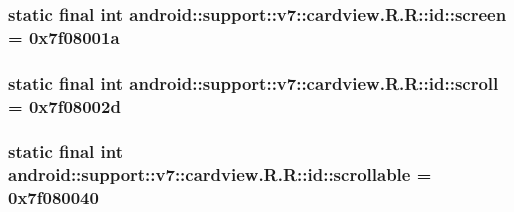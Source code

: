 \hypertarget{classandroid_1_1support_1_1v7_1_1cardview_1_1_r_1_1id_4f2f7f2b1b4bc84c004653ac2153b336}{
\subsubsection[{screen}]{\setlength{\rightskip}{0pt plus 5cm}static final int android::support::v7::cardview.R.R::id::screen = 0x7f08001a}}
\label{classandroid_1_1support_1_1v7_1_1cardview_1_1_r_1_1id_4f2f7f2b1b4bc84c004653ac2153b336}


\hypertarget{classandroid_1_1support_1_1v7_1_1cardview_1_1_r_1_1id_593858cac4963507c01fa0c3f04558a8}{
\subsubsection[{scroll}]{\setlength{\rightskip}{0pt plus 5cm}static final int android::support::v7::cardview.R.R::id::scroll = 0x7f08002d}}
\label{classandroid_1_1support_1_1v7_1_1cardview_1_1_r_1_1id_593858cac4963507c01fa0c3f04558a8}


\hypertarget{classandroid_1_1support_1_1v7_1_1cardview_1_1_r_1_1id_bbe9f03ce70603d5ee0def2319e61fc4}{
\subsubsection[{scrollable}]{\setlength{\rightskip}{0pt plus 5cm}static final int android::support::v7::cardview.R.R::id::scrollable = 0x7f080040}}
\label{classandroid_1_1support_1_1v7_1_1cardview_1_1_r_1_1id_bbe9f03ce70603d5ee0def2319e61fc4}


